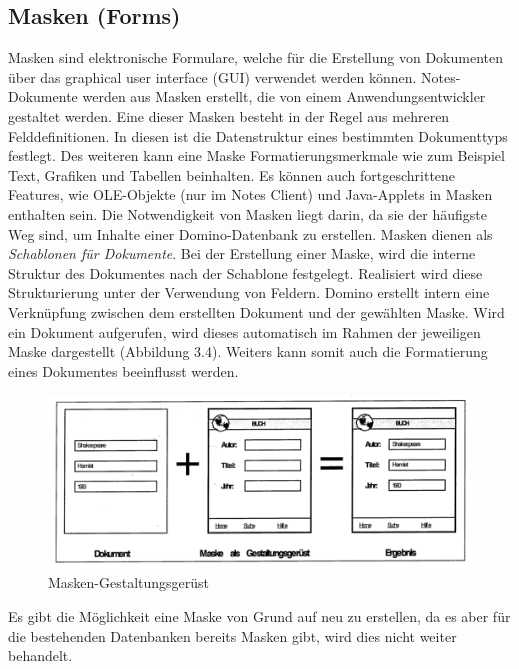 
\subsection{Masken (Forms)}
\label{sec:4designelemente}

Masken sind elektronische Formulare, welche f\"ur die Erstellung von Dokumenten \"uber das graphical user interface (GUI) verwendet werden k\"onnen. 
Notes-Dokumente werden aus Masken erstellt, die von einem Anwendungsentwickler gestaltet werden.
Eine dieser Masken besteht in der Regel aus mehreren Felddefinitionen. 
In diesen ist die Datenstruktur eines bestimmten Dokumenttyps festlegt. Des weiteren kann eine Maske Formatierungsmerkmale
wie zum Beispiel Text, Grafiken und Tabellen beinhalten. Es können auch fortgeschrittene Features, wie OLE-Objekte (nur im Notes Client) und Java-Applets
in Masken enthalten sein.
Die Notwendigkeit von Masken liegt darin, da sie der häufigste Weg sind, um Inhalte einer Domino-Datenbank zu erstellen.\newline
Masken dienen als \textit{Schablonen für Dokumente}.
Bei der Erstellung einer Maske, wird die interne Struktur des Dokumentes nach der Schablone festgelegt. Realisiert wird diese Strukturierung
unter der Verwendung von Feldern. Domino erstellt intern eine Verknüpfung zwischen dem erstellten Dokument und der gewählten Maske. 
Wird ein Dokument aufgerufen, wird dieses automatisch im Rahmen der jeweiligen Maske dargestellt (Abbildung 3.4). Weiters kann somit auch die 
Formatierung eines Dokumentes beeinflusst werden\cite{knaepper}.

\begin{figure}[H]
    \centerline{\includegraphics[scale=0.7]{pics/maskeGestaltung.png}}
    \caption[Maskengerüst]{\label{FiG:Maskengerüst }
	Masken-Gestaltungsgerüst\cite{knaepper}}
\end{figure}

Es gibt die Möglichkeit eine Maske von Grund auf neu zu erstellen, da es aber für die bestehenden Datenbanken bereits Masken gibt, wird
dies nicht weiter behandelt.

